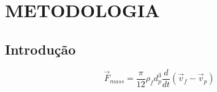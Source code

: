 \chapter{METODOLOGIA}
\label{metodologia}
\section{\textbf{Introdução}}

\begin{equation}
    \vec{F}_{mass} = \dfrac{\pi}{12} \rho_{f} d_{p}^3 \dfrac{d}{dt} \left(\vec{v}_{f} - \vec{v}_{p} \right) 
    \label{added_mass} 
\end{equation}
